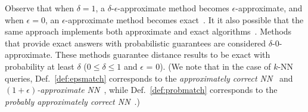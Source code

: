 

Observe that when $\delta = 1$, a $\delta$-$\epsilon$-approximate method becomes $\epsilon$-approximate, and when $\epsilon=0$, an $\epsilon$-approximate method becomes exact~\cite{conf/icde/Ciaccia2000}.
It it also possible that the same approach implements both approximate and exact algorithms~\cite{conf/kdd/shieh1998,conf/vldb/Wang2013,journal/kais/Camerra2014,journal/vldb/Zoumpatianos2016,journal/edbt/Schafer2012}. 
Methods that provide exact answers with probabilistic guarantees are considered $\delta$-0-approximate. 
These methods guarantee distance results to be exact with probability at least $\delta$ ($0 \leq \delta \leq 1$ and $\epsilon$ = 0).
(We note that in the case of $k$-NN queries, Def.~\ref{def:epsmatch} corresponds to the \emph{approximately correct NN}~\cite{conf/icde/Ciaccia2000} and \emph{$(1+\epsilon)$-approximate NN}~\cite{journal/acm/Arya1998}, while  Def.~\ref{def:probmatch} corresponds to the \emph{probably approximately correct NN}~\cite{conf/icde/Ciaccia2000}.)

